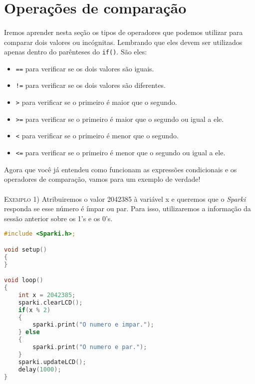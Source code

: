    \section{Operações de comparação}
    
    \paragraph{}
    Iremos aprender nesta seção os tipos de operadores que podemos utilizar para comparar dois valores ou incógnitas. Lembrando que eles devem ser utilizados apenas dentro do parênteses do \lstinline[columns=fixed]{if()}. São eles:
    
    \begin{itemize}
        \item \lstinline[columns=fixed]{==} para verificar se os dois valores são iguais.
        \item \lstinline[columns=fixed]{!=} para verificar se os dois valores são diferentes.
        \item \lstinline[columns=fixed]{>} para verificar se o primeiro é maior que o segundo.
        \item \lstinline[columns=fixed]{>=} para verificar se o primeiro é maior que o segundo ou igual a ele.
        \item \lstinline[columns=fixed]{<} para verificar se o primeiro é menor que o segundo.
        \item \lstinline[columns=fixed]{<=} para verificar se o primeiro é menor que o segundo ou igual a ele.
    \end{itemize}
    
    Agora que você já entendeu como funcionam as expressões condicionais e os operadores de comparação, vamos para um exemplo de verdade!
    \\~\\
    \textsc{Exemplo 1)} Atribuiremos o valor 2042385 à variável x e queremos que o \textsl{Sparki} responda se esse número é ímpar ou par. Para isso, utilizaremos a informação da sessão anterior sobre os 1's e os 0's.

    \begin{lstlisting}[language=C]
#include <Sparki.h>;

void setup()
{
}

void loop()
{
    int x = 2042385;
    sparki.clearLCD();
    if(x % 2) 
    {
        sparki.print("O numero e impar.");
    } else 
    {
        sparki.print("O numero e par.");
    }
    sparki.updateLCD();
    delay(1000);
}
\end{lstlisting}
    
